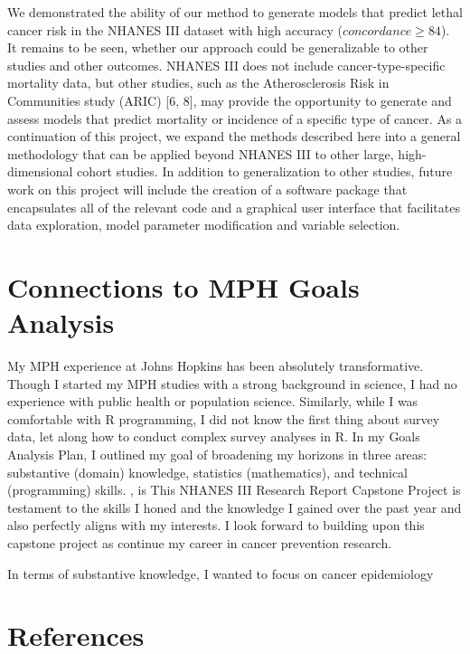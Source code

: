 \documentclass[12pt,oneside]{reedthesis}
\theoremstyle{definition}
\theoremstyle{definition}
\theoremstyle{definition}
\theoremstyle{remark}
\begin{document}
We demonstrated the ability of our method to generate models that
predict lethal cancer risk in the NHANES III dataset with high accuracy
(\(concordance \geq 84\)). It remains to be seen, whether our approach
could be generalizable to other studies and other outcomes. NHANES III
does not include cancer-type-specific mortality data, but other studies,
such as the Atherosclerosis Risk in Communities study (ARIC) {[}6, 8{]},
may provide the opportunity to generate and assess models that predict
mortality or incidence of a specific type of cancer. As a continuation
of this project, we expand the methods described here into a general
methodology that can be applied beyond NHANES III to other large,
high-dimensional cohort studies. In addition to generalization to other
studies, future work on this project will include the creation of a
software package that encapsulates all of the relevant code and a
graphical user interface that facilitates data exploration, model
parameter modification and variable selection.

\hypertarget{connections-to-mph-goals-analysis}{%
\section*{Connections to MPH Goals
Analysis}\label{connections-to-mph-goals-analysis}}

My MPH experience at Johns Hopkins has been absolutely transformative.
Though I started my MPH studies with a strong background in science, I
had no experience with public health or population science. Similarly,
while I was comfortable with R programming, I did not know the first
thing about survey data, let along how to conduct complex survey
analyses in R. In my Goals Analysis Plan, I outlined my goal of
broadening my horizons in three areas: substantive (domain) knowledge,
statistics (mathematics), and technical (programming) skills. , is This
NHANES III Research Report Capstone Project is testament to the skills I
honed and the knowledge I gained over the past year and also perfectly
aligns with my interests. I look forward to building upon this capstone
project as continue my career in cancer prevention research.

In terms of substantive knowledge, I wanted to focus on cancer
epidemiology

\hypertarget{references}{%
\section*{References}\label{references}}
\end{document}
